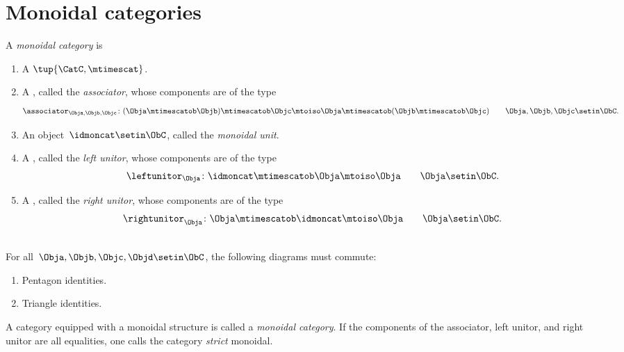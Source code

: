 
\section{Monoidal categories}\label{sec:monoidal-stacking}


\begin{ctdefinition}
    \label{def:monoidal-cat}
    A \emph{monoidal category} is

    \constit
    \begin{enumerate}
        \item A  $\tup{\CatC, \mtimescat}$.
        \item A , called the \emph{associator}, whose components are of the type
              \begin{equation}
                  \associator_{\Obja,\Objb,\Objc}\colon (\Obja \mtimescatob \Objb )\mtimescatob \Objc \mtoiso \Obja\mtimescatob (\Objb \mtimescatob \Objc) \quad \quad \Obja,\Objb,\Objc\setin \ObC.
              \end{equation}
        \item An object~$\idmoncat \setin \ObC$, called the \emph{monoidal unit}.
        \item A , called the \emph{left unitor}, whose components are of the type
              \begin{equation}
                  \leftunitor_\Obja \colon \idmoncat\mtimescatob \Obja \mtoiso \Obja \quad \quad \Obja\setin \ObC.
              \end{equation}
        \item A , called the \emph{right unitor}, whose components are of the type
              \begin{equation}
                  \rightunitor_\Obja \colon \Obja \mtimescatob \idmoncat \mtoiso \Obja \quad \quad \Obja\setin \ObC.
              \end{equation}
    \end{enumerate}

    \condit\\
    For all~$\Obja,\Objb,\Objc,\Objd\setin \ObC$, the following diagrams must commute:
    \begin{enumerate}
        \item Pentagon identities.
        \item Triangle identities.
    \end{enumerate}

    A category equipped with a monoidal structure is called a \emph{monoidal category}.
    If the components of the associator, left unitor, and right unitor are all equalities, one calls the category \emph{strict} monoidal.
\end{ctdefinition}

